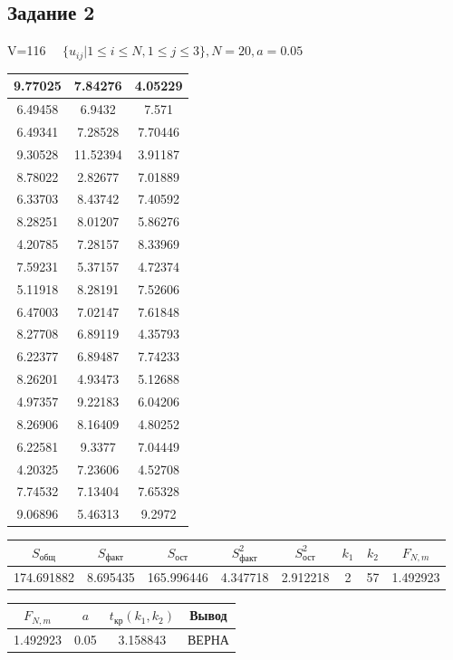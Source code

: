 \subsection{Задание 2}%
\label{subsec:2}%
%
V=116%
$\quad \{ u_{ij}|1 \le i \le N, 1\le j \le 3 \}, N=20, a =0.05 $

%
\begin{changemargin}{0cm}{0cm}\small{%
\center%
\begin{tabular}{|c|c|c|}%
\hline%
9.77025&7.84276&4.05229\\%
\hline%
6.49458&6.9432&7.571\\%
\hline%
6.49341&7.28528&7.70446\\%
\hline%
9.30528&11.52394&3.91187\\%
\hline%
8.78022&2.82677&7.01889\\%
\hline%
6.33703&8.43742&7.40592\\%
\hline%
8.28251&8.01207&5.86276\\%
\hline%
4.20785&7.28157&8.33969\\%
\hline%
7.59231&5.37157&4.72374\\%
\hline%
5.11918&8.28191&7.52606\\%
\hline%
6.47003&7.02147&7.61848\\%
\hline%
8.27708&6.89119&4.35793\\%
\hline%
6.22377&6.89487&7.74233\\%
\hline%
8.26201&4.93473&5.12688\\%
\hline%
4.97357&9.22183&6.04206\\%
\hline%
8.26906&8.16409&4.80252\\%
\hline%
6.22581&9.3377&7.04449\\%
\hline%
4.20325&7.23606&4.52708\\%
\hline%
7.74532&7.13404&7.65328\\%
\hline%
9.06896&5.46313&9.2972\\%
\hline%
\end{tabular}%
\newline%
\newline%
%
}\end{changemargin}%
\begin{changemargin}{-0cm}{0cm}\small{%
\center%
\begin{tabular}{|c|c|c|c|c|c|c|c|}%
\hline%
$S_{\text{общ}}$&$S_{\text{факт}}$&$S_{\text{ост}}$&$S_{\text{факт}}^2$&$S_{\text{ост}}^2$&$k_1$&$k_2$&$F_{N,m}$\\%
\hline%
174.691882&8.695435&165.996446&4.347718&2.912218&2&57&1.492923\\%
\hline%
\end{tabular}%
\newline%
\newline%
%
}\end{changemargin}%
\begin{changemargin}{-0cm}{0cm}\small{%
\center%
\begin{tabular}{|c|c|c|c|}%
\hline%
$F_{N,m}$&$a$&$t_{\text{кр}} (k_1, k_2)$&Вывод\\%
\hline%
1.492923&0.05&3.158843&ВЕРНА\\%
\hline%
\end{tabular}%
\newline%
\newline%
%
}\end{changemargin}